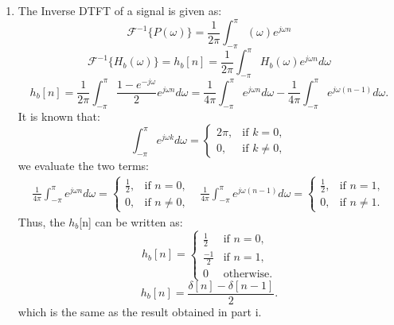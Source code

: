\documentclass{article}
\begin{document}
\begin{enumerate}
\begin{enumerate}
\begin{enumerate}
 \item
                The Inverse DTFT of a signal is given as:
                \[
                    \mathcal{F}^{-1}\{P(\omega)\} = \frac{1}{2\pi}\int_{-\pi}^{\pi}(\omega)e^{j\omega n}
                \]
                \[
                    \mathcal{F}^{-1}\{H_b(\omega)\} = h_b[n] = \frac{1}{2\pi} \int_{-\pi}^{\pi}H_b(\omega) e^{j\omega n} d\omega
                \]
                \[
                    h_b[n] = \frac{1}{2\pi} \int_{-\pi}^{\pi} \frac{1 - e^{-j\omega}}{2} e^{j\omega n} d\omega = \frac{1}{4\pi} \int_{-\pi}^{\pi} e^{j\omega n} d\omega - \frac{1}{4\pi} \int_{-\pi}^{\pi} e^{j\omega (n-1)} d\omega.
                \]
                It is known that: 
                \[
                    \int_{-\pi}^{\pi} e^{j\omega k} d\omega =
                    \begin{cases}
                        2\pi, & \text{if } k = 0, \\
                        0, & \text{if } k \neq 0,
                    \end{cases}
                \]
                we evaluate the two terms:
                \[
                    \begin{array}{cc}
                        \frac{1}{4\pi} \int_{-\pi}^{\pi} e^{j\omega n} d\omega =
                        \begin{cases}
                            \frac{1}{2}, & \text{if } n = 0, \\
                            0, & \text{if } n \neq 0,
                        \end{cases}
                        &
                        \frac{1}{4\pi} \int_{-\pi}^{\pi} e^{j\omega (n-1)} d\omega =
                        \begin{cases}
                            \frac{1}{2}, & \text{if } n = 1, \\
                            0, & \text{if } n \neq 1.
                        \end{cases}
                    \end{array}
                \]
                Thus, the $h_b$[n] can be written as:
                \[
                    h_b[n] =
                        \begin{cases} 
                        \frac{1}{2} & \text{if } n = 0, \\
                        \frac{-1}{2} & \text{if } n = 1, \\
                        0 & \text{otherwise.}
                        \end{cases}
                \]
                \[
                    h_b[n] =\frac{\delta[n] - \delta[n-1]}{2}.
                \]
                which is the same as the result obtained in part i.


\end{enumerate}
\end{enumerate}
\end{enumerate}
\end{document}
